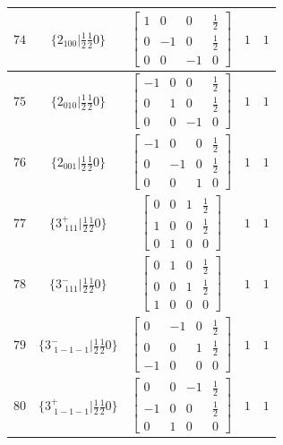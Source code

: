 \documentclass[fleqn,8pt]{jsarticle}
\begin{document}
\begin{longtable}{ccccc}
$ 74 $ & $ \{2{}_{100}|\frac{1}{2} \frac{1}{2} 0\} $ & $ \begin{bmatrix} 1 & 0 & 0 & \frac{1}{2} \\ 0 & -1 & 0 & \frac{1}{2} \\ 0 & 0 & -1 & 0 \end{bmatrix} $ & $ 1 $ & $ 1 $ \\ \hline
$ 75 $ & $ \{2{}_{010}|\frac{1}{2} \frac{1}{2} 0\} $ & $ \begin{bmatrix} -1 & 0 & 0 & \frac{1}{2} \\ 0 & 1 & 0 & \frac{1}{2} \\ 0 & 0 & -1 & 0 \end{bmatrix} $ & $ 1 $ & $ 1 $ \\ \hline
$ 76 $ & $ \{2{}_{001}|\frac{1}{2} \frac{1}{2} 0\} $ & $ \begin{bmatrix} -1 & 0 & 0 & \frac{1}{2} \\ 0 & -1 & 0 & \frac{1}{2} \\ 0 & 0 & 1 & 0 \end{bmatrix} $ & $ 1 $ & $ 1 $ \\ \hline
$ 77 $ & $ \{3^{+}_{\,\,111}|\frac{1}{2} \frac{1}{2} 0\} $ & $ \begin{bmatrix} 0 & 0 & 1 & \frac{1}{2} \\ 1 & 0 & 0 & \frac{1}{2} \\ 0 & 1 & 0 & 0 \end{bmatrix} $ & $ 1 $ & $ 1 $ \\ \hline
$ 78 $ & $ \{3^{-}_{\,\,111}|\frac{1}{2} \frac{1}{2} 0\} $ & $ \begin{bmatrix} 0 & 1 & 0 & \frac{1}{2} \\ 0 & 0 & 1 & \frac{1}{2} \\ 1 & 0 & 0 & 0 \end{bmatrix} $ & $ 1 $ & $ 1 $ \\ \hline
$ 79 $ & $ \{3^{-}_{\,\,1-1-1}|\frac{1}{2} \frac{1}{2} 0\} $ & $ \begin{bmatrix} 0 & -1 & 0 & \frac{1}{2} \\ 0 & 0 & 1 & \frac{1}{2} \\ -1 & 0 & 0 & 0 \end{bmatrix} $ & $ 1 $ & $ 1 $ \\ \hline
$ 80 $ & $ \{3^{+}_{\,\,1-1-1}|\frac{1}{2} \frac{1}{2} 0\} $ & $ \begin{bmatrix} 0 & 0 & -1 & \frac{1}{2} \\ -1 & 0 & 0 & \frac{1}{2} \\ 0 & 1 & 0 & 0 \end{bmatrix} $ & $ 1 $ & $ 1 $ \\ \hline

\end{longtable}
\end{document}
